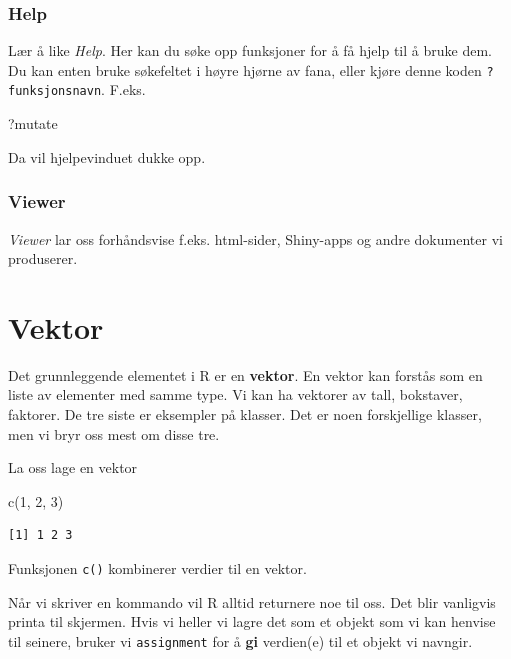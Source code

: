 \documentclass[
  letterpaper,
  DIV=11,
  numbers=noendperiod]{scrreprt}
\newenvironment{Shaded}{\begin{snugshade}}{\end{snugshade}}
\newcommand{\DecValTok}[1]{\textcolor[rgb]{0.68,0.00,0.00}{#1}}
\newcommand{\FunctionTok}[1]{\textcolor[rgb]{0.28,0.35,0.67}{#1}}
\newcommand{\NormalTok}[1]{\textcolor[rgb]{0.00,0.23,0.31}{#1}}
\begin{document}
\hypertarget{help}{%
\subsubsection{Help}\label{help}}

Lær å like \emph{Help}. Her kan du søke opp funksjoner for å få hjelp
til å bruke dem. Du kan enten bruke søkefeltet i høyre hjørne av fana,
eller kjøre denne koden \texttt{?funksjonsnavn}. F.eks.

\begin{Shaded}
\begin{Highlighting}[]
\NormalTok{?mutate}
\end{Highlighting}
\end{Shaded}

Da vil hjelpevinduet dukke opp.

\hypertarget{viewer}{%
\subsubsection{Viewer}\label{viewer}}

\emph{Viewer} lar oss forhåndsvise f.eks. html-sider, Shiny-apps og
andre dokumenter vi produserer.

\hypertarget{vektor}{%
\section{Vektor}\label{vektor}}

Det grunnleggende elementet i R er en \textbf{vektor}. En vektor kan
forstås som en liste av elementer med samme type. Vi kan ha vektorer av
tall, bokstaver, faktorer. De tre siste er eksempler på klasser. Det er
noen forskjellige klasser, men vi bryr oss mest om disse tre.

La oss lage en vektor

\begin{Shaded}
\begin{Highlighting}[]
\FunctionTok{c}\NormalTok{(}\DecValTok{1}\NormalTok{, }\DecValTok{2}\NormalTok{, }\DecValTok{3}\NormalTok{)}
\end{Highlighting}
\end{Shaded}

\begin{verbatim}
[1] 1 2 3
\end{verbatim}

Funksjonen \texttt{c()} kombinerer verdier til en vektor.

Når vi skriver en kommando vil R alltid returnere noe til oss. Det blir
vanligvis printa til skjermen. Hvis vi heller vi lagre det som et objekt
som vi kan henvise til seinere, bruker vi \texttt{assignment} for å
\textbf{gi} verdien(e) til et objekt vi navngir.
\end{document}
